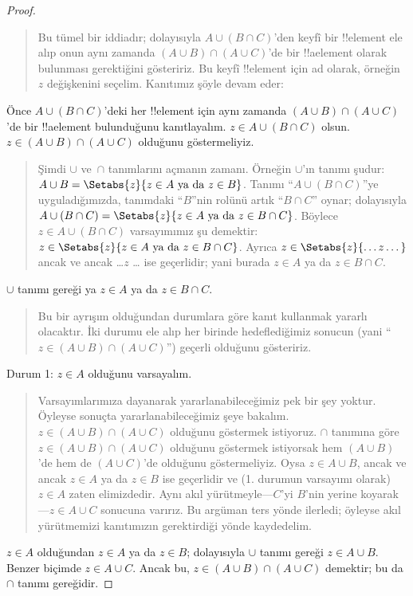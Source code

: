 \begin{proof}
\begin{quote}
Bu tümel bir iddiadır; dolayısıyla $A \cup (B \cap C)$'den keyfî bir
!!{element} ele alıp onun aynı zamanda $(A \cup B) \cap (A \cup
C)$'de bir !!a{element} olarak bulunması gerektiğini gösteririz. Bu keyfî
!!{element} için ad olarak, örneğin~$z$ değişkenini seçelim.
Kanıtımız şöyle devam eder:
\end{quote}
Önce $A \cup (B \cap C)$'deki her !!{element} için aynı zamanda $(A \cup
B) \cap (A \cup C)$'de bir !!a{element} bulunduğunu kanıtlayalım. $z
\in A \cup (B \cap C)$ olsun. $z \in (A \cup B) \cap (A \cup C)$
olduğunu göstermeliyiz.
\begin{quote}
Şimdi $\cup$ ve~$\cap$ tanımlarını açmanın zamanı. Örneğin $\cup$'ın
tanımı şudur: $A \cup B = \Setabs{z}{z \in A \text{ ya da } z \in B}$.
Tanımı ``$A \cup (B \cap C)$''ye uyguladığımızda, tanımdaki ``$B$''nin
rolünü artık ``$B \cap C$'' oynar; dolayısıyla $A \cup (B \cap C) =
\Setabs{z}{z \in A \text{ ya da } z \in B \cap C}$. Böylece $z \in A
\cup (B \cap C)$ varsayımımız şu demektir: $z \in \Setabs{z}{z \in A
\text{ ya da } z \in B \cap C}$. Ayrıca $z \in
\Setabs{z}{\dots z\dots}$ ancak ve ancak \dots $z$ \dots{} ise
geçerlidir; yani burada $z \in A$ ya da $z \in B \cap C$.
\end{quote}
$\cup$ tanımı gereği ya $z \in A$ ya da $z \in B \cap C$.
\begin{quote}
Bu bir ayrışım olduğundan durumlara göre kanıt kullanmak yararlı
olacaktır. İki durumu ele alıp her birinde hedeflediğimiz sonucun (yani
``$z \in (A \cup B) \cap (A \cup C)$'') geçerli olduğunu gösteririz.
\end{quote}
Durum 1: $z \in A$ olduğunu varsayalım.
\begin{quote}
Varsayımlarımıza dayanarak yararlanabileceğimiz pek bir şey yoktur.
Öyleyse sonuçta yararlanabileceğimiz şeye bakalım. $z \in (A \cup B)
\cap (A \cup C)$ olduğunu göstermek istiyoruz. $\cap$ tanımına göre $z
\in (A \cup B) \cap (A \cup C)$ olduğunu göstermek istiyorsak hem $(A
\cup B)$'de hem de $(A \cup C)$'de olduğunu göstermeliyiz. Oysa $z \in
A \cup B$, ancak ve ancak $z \in A$ ya da $z \in B$ ise geçerlidir ve
  (1. durumun varsayımı olarak) $z \in A$ zaten elimizdedir. Aynı akıl
  yürütmeyle---$C$'yi $B$'nin yerine koyarak---$z \in A \cup C$ sonucuna varırız.
Bu argüman ters yönde ilerledi; öyleyse akıl yürütmemizi kanıtımızın
gerektirdiği yönde kaydedelim.
\end{quote}
$z \in A$ olduğundan $z \in A$ ya da $z \in B$; dolayısıyla $\cup$
tanımı gereği $z \in A \cup B$. Benzer biçimde $z \in A \cup C$. Ancak
bu, $z \in (A \cup B) \cap (A \cup C)$ demektir; bu da $\cap$ tanımı gereğidir.

\end{proof}

